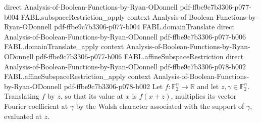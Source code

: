 \begin{theorem}
  {direct}
  {Analysis-of-Boolean-Functions-by-Ryan-ODonnell}
  {pdf-ffbe9c7b3306-p077-b004}
\proofstep
  {FABL.subspaceRestriction_apply}
  {context}
  {Analysis-of-Boolean-Functions-by-Ryan-ODonnell}
  {pdf-ffbe9c7b3306-p077-b004}
\proofstep
  {FABL.domainTranslate}
  {direct}
  {Analysis-of-Boolean-Functions-by-Ryan-ODonnell}
  {pdf-ffbe9c7b3306-p077-b006}
\proofstep
  {FABL.domainTranslate_apply}
  {context}
  {Analysis-of-Boolean-Functions-by-Ryan-ODonnell}
  {pdf-ffbe9c7b3306-p077-b006}
\proofstep
  {FABL.affineSubspaceRestriction}
  {direct}
  {Analysis-of-Boolean-Functions-by-Ryan-ODonnell}
  {pdf-ffbe9c7b3306-p078-b002}
\proofstep
  {FABL.affineSubspaceRestriction_apply}
  {context}
  {Analysis-of-Boolean-Functions-by-Ryan-ODonnell}
  {pdf-ffbe9c7b3306-p078-b002}
Let $f\colon\mathbb F_2^n\to\mathbb R$ and let $z,\gamma\in\mathbb F_2^n$. Translating
$f$ by $z$, so that its value at $x$ is $f(x+z)$, multiplies its vector Fourier
coefficient at $\gamma$ by the Walsh character associated with the support of $\gamma$,
evaluated at $z$.
\end{theorem}

